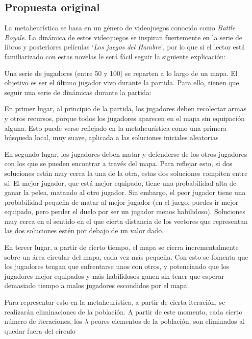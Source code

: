 \documentclass[11pt]{article}
\begin{document}
\subsection{Propuesta original}

La metaheurística se basa en un género de videojuegos conocido como \emph{Battle Royale}. La dinámica de estos videojuegos se inspiran fuertemente en la serie de libros y posteriores películas `\emph{Los juegos del Hambre}', por lo que si el lector está familiarizado con estas novelas le será fácil seguir la siguiente explicación:

Una serie de jugadores (entre 50 y 100) se reparten a lo largo de un mapa. El objetivo es ser el último jugador vivo durante la partida. Para ello, tienen que seguir una serie de dinámicas durante la partida:

En primer lugar, al principio de la partida, los jugadores deben recolectar armas y otros recursos, porque todos los jugadores aparecen en el mapa sin equipación alguna. Esto puede verse reflejado en la metaheurística como una primera búsqueda local, muy suave, aplicada a las soluciones iniciales aleatorias

En segundo lugar, los jugadores deben matar y defenderse de los otros jugadores con los que se pueden encontrar a través del mapa. Para reflejar esto, si dos soluciones están muy cerca la una de la otra, estas dos soluciones compiten entre sí. El mejor jugador, que está mejor equipado, tiene una probabilidad alta de ganar la pelea, matando al otro jugador. Sin embargo, el peor jugador tiene una probabilidad pequeña de matar al mejor jugador (en el juego, puedes ir mejor equipado, pero perder el duelo por ser un jugador menos habilidoso). Soluciones muy cerca en el sentido en el que cierta distancia de los vectores que representan las dos soluciones estén por debajo de un valor dado.

En tercer lugar, a partir de cierto tiempo, el mapa se cierra incrementalmente sobre un área circular del mapa, cada vez más pequeña. Con esto se fomenta que los jugadores tengan que enfrentarse unos con otros, y potenciando que los jugadores mejor equipados y más habilidosos ganen sin tener que esperar demasiado tiempo a malos jugadores escondidos por el mapa.

Para representar esto en la metaheurística, a partir de cierta iteración, se realizarán eliminaciones de la población. A partir de este momento, cada cierto número de iteraciones, los $\lambda$ peores elementos de la población, son eliminados al quedar fuera del círculo
\end{document}
